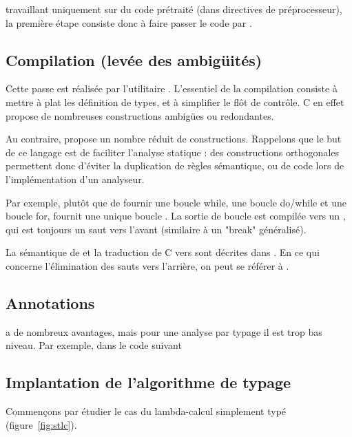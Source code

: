 \ctonewspeak{} travaillant uniquement sur du code prétraité (dans directives de
préprocesseur), la première étape consiste donc à faire passer le code par \cpp.

\subsection{Compilation (levée des ambigüités)}

Cette passe est réalisée par l'utilitaire \ctonewspeak{}. L'essentiel de la
compilation consiste à mettre à plat les définition de types, et à simplifier le
flôt de contrôle. C en effet propose de nombreuses constructions ambigües ou
redondantes.

Au contraire, \newspeak{} propose un nombre réduit de constructions. Rappelons
que le but de ce langage est de faciliter l'analyse statique : des constructions
orthogonales permettent donc d'éviter la duplication de règles sémantique, ou de
code lors de l'implémentation d'un analyseur.

Par exemple, plutôt que de fournir une boucle while, une boucle do/while et une
boucle for, \newspeak{} fournit une unique boucle \npkWhile{}. La sortie de
boucle est compilée vers un \npkGoto{}, qui est toujours un saut vers l'avant
(similaire à un "break" généralisé).

La sémantique de \newspeak{} et la traduction de C vers \newspeak{} sont
décrites dans \cite{newspeak}. En ce qui concerne l'élimination des sauts vers
l'arrière, on peut se référer à \cite{goto}.

\subsection{Annotations}

\newspeak{} a de nombreux avantages, mais pour une analyse par typage il est
trop bas niveau. Par exemple, dans le code suivant



\subsection{Implantation de l'algorithme de typage}

Commençons par étudier le cas du lambda-calcul simplement typé
(figure~\ref{fig:stlc}).

